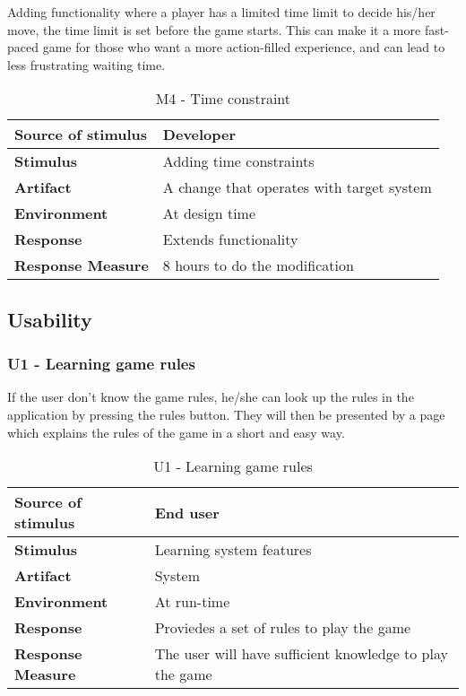 Adding functionality where a player has a limited time limit to decide his/her move, the time limit is set before the game starts. This can make it a more fast-paced game for those who want a more action-filled experience, and can lead to less frustrating waiting time.

\begin{table}[h!]
\begin{tabular}{ | p{110pt} | p{250pt}  |}
\hline
\bf Source of stimulus &  Developer  \\ \hline
\bf Stimulus & Adding time constraints \\ \hline 
\bf Artifact & A change that operates with target system  \\  \hline
\bf Environment & At design time \\ \hline
\bf Response & Extends functionality \\ \hline
\bf Response Measure & 8 hours to do the modification \\ \hline

\end{tabular}
\caption{M4 - Time constraint}
\end{table}

\subsection{Usability}

\subsubsection{U1 - Learning game rules}

If the user don't know the game rules,  he/she can look up the rules in the application by pressing the rules button. They will then be presented by a page which explains the rules of the game in a short and easy way.

\begin{table}[h!]
\begin{tabular}{ | p{110pt} | p{250pt}  |}
\hline
\bf Source of stimulus &  End user  \\ \hline
\bf Stimulus & Learning system features \\ \hline 
\bf Artifact & System  \\  \hline
\bf Environment & At run-time \\ \hline
\bf Response & Proviedes a set of rules to play the game \\ \hline
\bf Response Measure & The user will have sufficient knowledge to play the game \\ \hline

\end{tabular}
\caption{U1 - Learning game rules}
\end{table}

